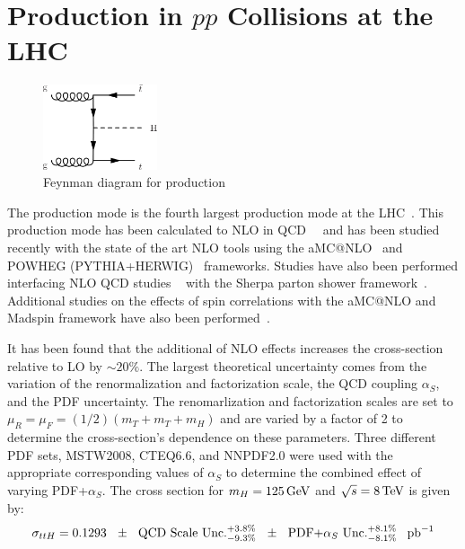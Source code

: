\section{\ttH Production in $pp$ Collisions at the LHC}
\label{ttH_production_overview}

\begin{figure}[h]
   \centering
  \includegraphics[width=0.3\textwidth]{Figures/Feynman_Diagrams/higgs_production__ttH.pdf}
  \caption{Feynman diagram for \ttH production} \label{fd:ttH_simple}
\end{figure}

\par The \ttH production mode is the fourth largest production mode at
the LHC~\cite{th:HiggsXS_2013}.  This production mode has been
calculated to NLO in
QCD~\cite{tthXS_NLO_BeenakkerEtAl_1}~\cite{tthXS_NLO_BeenakkerEtAl_2}
and has been studied recently with the state of the art NLO tools
using the aMC@NLO~\cite{tthXS_aMCatNLO_Frederix} and POWHEG
(PYTHIA+HERWIG)~\cite{tthXS_powheg_Garzelli} frameworks. Studies have
also been performed interfacing NLO QCD studies
~\cite{tthXS_NLO_Dawson} with the Sherpa parton shower
framework~\cite{tthXS_sherpa_Gleisberg}.  Additional studies on the
effects of spin correlations with the aMC@NLO and Madspin framework
have also been performed~\cite{tthXS_aMCatNLO_madspin_Artoisenet}.  

\par  It has been found that the additional of NLO effects increases
the cross-section relative to LO by $\sim20\%$.  The largest
theoretical uncertainty comes from the variation of the
renormalization and factorization scale, the QCD coupling $\alpha_{S}$,
and the PDF uncertainty.  The renomarlization and factorization scales
are set to $\mu_{R} = \mu_{F} = (1/2)(m_{T} + m_{T} + m_{H})$ and are
varied by a factor of 2 to determine the cross-section's dependence on
these parameters.  Three different PDF sets,  MSTW2008, CTEQ6.6, and
NNPDF2.0 were used with the appropriate corresponding values of
$\alpha_{S}$ to determine the combined effect of varying
PDF+$\alpha_{S}$.  The cross section for $m_{H} = 125\,\text{Ge\hspace{-.08em}V}$ and
$\sqrt{s}=8\,\text{Te\hspace{-.08em}V}$ is given by:
\begin{equation}\label{eq:tth_xs}
\sigma_{ttH} = 0.1293~~\pm \text{~~QCD Scale Unc.}^{+3.8\%}_{-9.3\%}~~\pm
\text{~~PDF+$\alpha_{S}$ Unc.}^{+8.1\%}_{-8.1\%}~~\mbox{\ensuremath{\,\text{pb}^\text{$-$1}}}
\end{equation}

